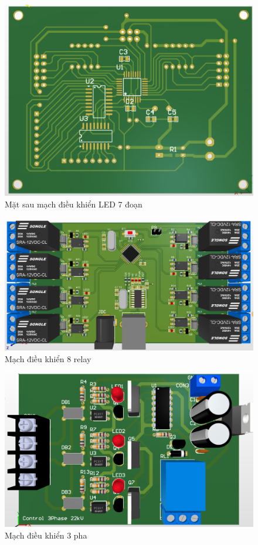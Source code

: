 \documentclass{article}
\begin{document}
\begin{figure}[H]
    \centering
    \includegraphics[width=1\textwidth]{image/pcb2.png}
    \caption{Mặt sau mạch điều khiển LED 7 đoạn}
    \label{fig:hbridge}
\end{figure}
\begin{figure}[H]
    \centering
    \includegraphics[width=1\textwidth]{image/pcb3.png}
    \caption{Mạch điều khiển 8 relay}
    \label{fig:hbridge}
\end{figure}
\begin{figure}[H]
    \centering
    \includegraphics[width=1\textwidth]{image/pcb4.png}
    \caption{Mạch điều khiển 3 pha}
    \label{fig:hbridge}
\end{figure}
\end{document}
